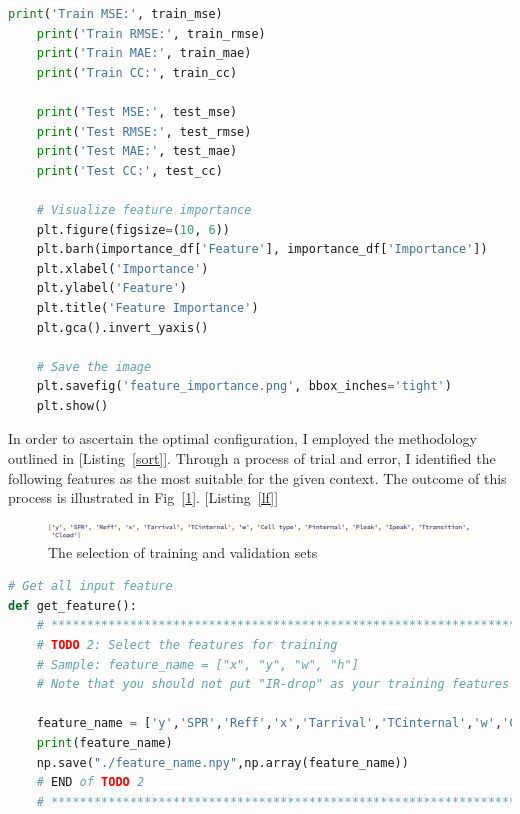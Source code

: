 \documentclass{article}
\begin{document}
\begin{lstlisting}[language={python}, caption={Features sort by importance}, label={sort}]
    print('Train MSE:', train_mse)
    print('Train RMSE:', train_rmse)
    print('Train MAE:', train_mae)
    print('Train CC:', train_cc)
    
    print('Test MSE:', test_mse)
    print('Test RMSE:', test_rmse)
    print('Test MAE:', test_mae)
    print('Test CC:', test_cc)
    
    # Visualize feature importance
    plt.figure(figsize=(10, 6))
    plt.barh(importance_df['Feature'], importance_df['Importance'])
    plt.xlabel('Importance')
    plt.ylabel('Feature')
    plt.title('Feature Importance')
    plt.gca().invert_yaxis()
    
    # Save the image
    plt.savefig('feature_importance.png', bbox_inches='tight')
    plt.show()
    \end{lstlisting}


  In order to ascertain the optimal configuration, I employed the methodology outlined in [Listing~\ref{sort}]. Through a process of trial and error, I identified the following features as the most suitable for the given context. The outcome of this process is illustrated in Fig~[\ref{pf}]. [Listing~\ref{lf}]

  \begin{figure}[H]
    \centering
    \includegraphics[width=\linewidth]{./img/2024-06-13-22-33-47.png}
    \caption{The selection of training and validation sets}
    \label{pf}
  \end{figure}

  \vspace*{-1em} 

\begin{lstlisting}[language={python}, caption={Get features}, label={lf}]
# Get all input feature
def get_feature():
    # ******************************************************************
    # TODO 2: Select the features for training
    # Sample: feature_name = ["x", "y", "w", "h"]
    # Note that you should not put "IR-drop" as your training features
    
    feature_name = ['y','SPR','Reff','x','Tarrival','TCinternal','w','Cell type','Pinternal','Pleak','Ipeak','Ttransition','Cload'] 
    print(feature_name)
    np.save("./feature_name.npy",np.array(feature_name))
    # END of TODO 2
    # ******************************************************************    
\end{lstlisting}
\end{document}
